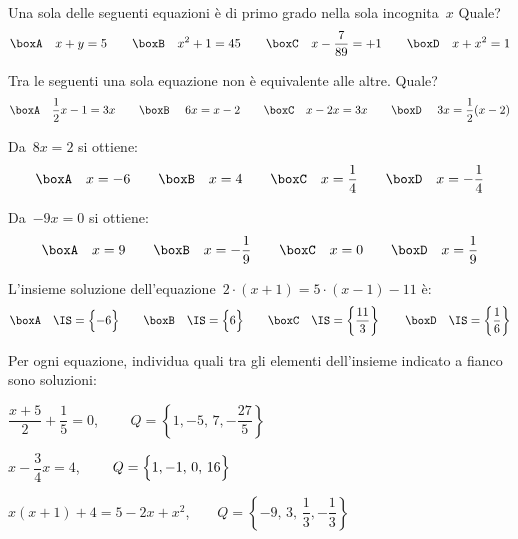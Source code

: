 \begin{esercizio}
\label{ese:13.45}
Una sola delle seguenti equazioni è di primo grado nella sola incognita~\(x\) 
Quale?
\[\boxA\quad x+y=5\qquad\boxB\quad x^{2}+1=45\qquad\boxC\quad 
x-\dfrac{7}{89}=+1\qquad\boxD\quad x+x^{2}=1\]
\end{esercizio}

\begin{esercizio}
\label{ese:13.46}
Tra le seguenti una sola equazione non è equivalente alle altre. Quale?
\[\boxA\quad \dfrac{1}{2}x-1=3x\qquad\boxB\quad~6x=x-2\qquad\boxC\quad 
x-2x=3x\qquad\boxD\quad~3x=\dfrac{1}{2}(x-2)\]
\end{esercizio}

\begin{esercizio}
\label{ese:13.47}
Da~\(8x=2\) si ottiene:
\[\boxA\quad x=-6\qquad\boxB\quad x=4\qquad\boxC\quad 
x=\dfrac{1}{4}\qquad\boxD\quad x=-{\dfrac{1}{4}}\]
\end{esercizio}

\begin{esercizio}
\label{ese:13.48}
Da~\(-9x=0\) si ottiene:
\[\boxA\quad x=9\qquad\boxB\quad x=-{\dfrac{1}{9}}\qquad\boxC\quad 
x=0\qquad\boxD\quad x=\dfrac{1}{9}\]
\end{esercizio}

\begin{esercizio}
\label{ese:13.49}
L'insieme soluzione dell'equazione~\(2\cdot \left(x+1\right)=5\cdot 
\left(x-1\right)-11\) è:
\[\boxA\quad \IS=\Bigl\{-6\Bigr\}\qquad\boxB\quad 
\IS=\Bigl\{6\Bigr\}\qquad\boxC\quad 
\IS=\left\{\dfrac{11}{3}\right\}\qquad\boxD\quad 
\IS=\left\{\dfrac{1}{6}\right\}\]
\end{esercizio}

\begin{esercizio}
\label{ese:13.50}
Per ogni equazione, individua quali tra gli elementi dell'insieme indicato a 
fianco sono soluzioni:
\begin{enumeratea}
\spazielenx
 \item \(\dfrac{x+5}{2}+\dfrac{1}{5}=0\), \(\qquad 
Q=\left\{1,-5,\,7,-\dfrac{27}{5}\right\}\)
 \item \(x-\dfrac{3}{4}x=4\), \(\qquad Q=\Bigl\{1,-1,\,0,\,16\Bigr\}\)
 \item \(x(x+1)+4=5-2x+x^{2}\),\(\qquad 
Q=\left\{-9,\,3,\,\dfrac{1}{3},-\dfrac{1}{3}\right\}\)
\end{enumeratea}
\end{esercizio}


\newpage %

